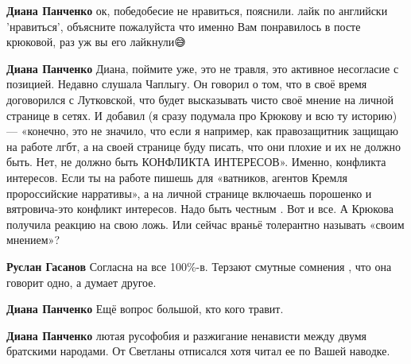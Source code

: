 \begin{itemize}
\begin{itemize}
\textbf{Диана Панченко} ок, победобесие не нравиться, пояснили. лайк по
английски 'нравиться', объясните пожалуйста что именно Вам понравилось в посте
крюковой, раз уж вы его лайкнули😅

 
\textbf{Диана Панченко} Диана, поймите уже, это не травля, это активное
несогласие с позицией. Недавно слушала Чаплыгу. Он говорил о том, что в своё
время договорился с Лутковской, что будет высказывать чисто своё мнение на
личной странице в сетях. И добавил (я сразу подумала про Крюкову и всю ту
историю)— «конечно, это не значило, что если я например, как правозащитник
защищаю на работе лгбт, а на своей странице буду писать, что они плохие и их не
должно быть. Нет, не должно быть КОНФЛИКТА ИНТЕРЕСОВ». Именно, конфликта
интересов. Если ты на работе пишешь для «ватников, агентов Кремля пророссийские
нарративы», а на личной странице включаешь порошенко и вятровича-это конфликт
интересов. Надо быть честным . Вот и все. А Крюкова получила реакцию на свою
ложь. Или сейчас враньё толерантно называть «своим мнением»?

 
\textbf{Руслан Гасанов} Согласна на все 100\%-в. Терзают смутные сомнения , что она говорит одно, а думает другое.

 
\textbf{Диана Панченко} Ещё вопрос большой, кто кого травит.

 
\textbf{Диана Панченко} лютая русофобия и разжигание ненависти между двумя братскими народами. От Светланы отписался хотя читал ее по Вашей наводке.


\end{itemize}
\end{itemize}
